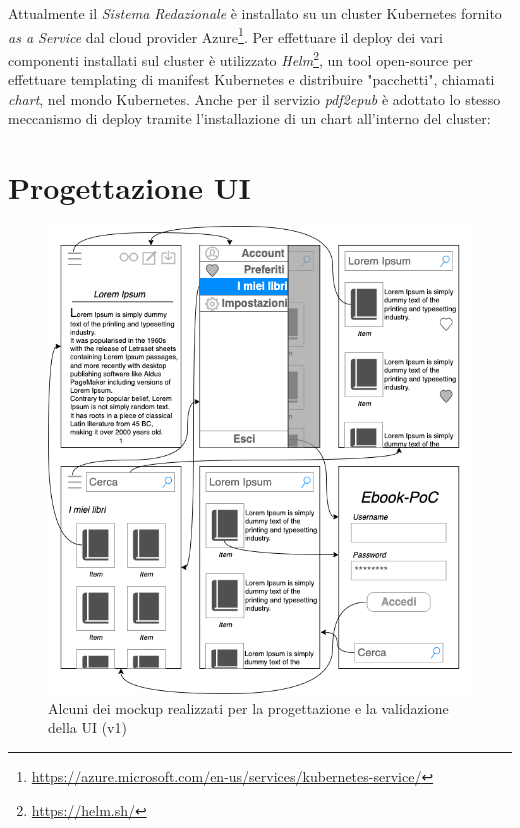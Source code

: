 Attualmente il \textit{Sistema Redazionale} è installato su un cluster Kubernetes fornito \textit{as a Service} dal cloud provider Azure\footnote{\url{https://azure.microsoft.com/en-us/services/kubernetes-service/}}. Per effettuare il deploy dei vari componenti installati sul cluster è utilizzato \textit{Helm}\footnote{\url{https://helm.sh/}}, un tool open-source per effettuare templating di manifest Kubernetes e distribuire "pacchetti", chiamati \textit{chart}, nel mondo Kubernetes. Anche per il servizio \textit{pdf2epub} è adottato lo stesso meccanismo di deploy tramite l'installazione di un chart all'interno del cluster:

\section{Progettazione UI}

\begin{figure}[H]
\centering
\includegraphics[width=1\textwidth]{img/tesi-14-mockup1.drawio.png}
\caption{Alcuni dei mockup realizzati per la progettazione e la validazione della UI (v1)}
\end{figure}